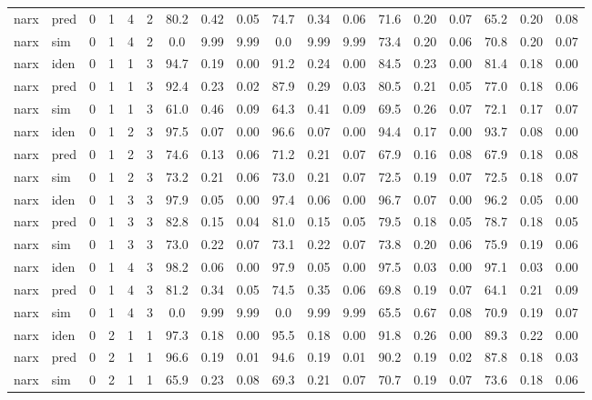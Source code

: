 \begin{landscape}
\begin{center}
\begin{longtable}{ll|cccc|ccc|ccc|ccc|ccc}
narx & pred & 0 & 1 & 4 & 2 & 80.2 & 0.42 & 0.05 & 74.7 & 0.34 & 0.06 & 71.6 & 0.20 & 0.07 & 65.2 & 0.20 & 0.08 \\ 
narx & sim  & 0 & 1 & 4 & 2 & 0.0 & 9.99 & 9.99 & 0.0 & 9.99 & 9.99 & 73.4 & 0.20 & 0.06 & 70.8 & 0.20 & 0.07 \\ 
 \hline 
narx & iden & 0 & 1 & 1 & 3 & 94.7 & 0.19 & 0.00 & 91.2 & 0.24 & 0.00 & 84.5 & 0.23 & 0.00 & 81.4 & 0.18 & 0.00 \\ 
narx & pred & 0 & 1 & 1 & 3 & 92.4 & 0.23 & 0.02 & 87.9 & 0.29 & 0.03 & 80.5 & 0.21 & 0.05 & 77.0 & 0.18 & 0.06 \\ 
narx & sim  & 0 & 1 & 1 & 3 & 61.0 & 0.46 & 0.09 & 64.3 & 0.41 & 0.09 & 69.5 & 0.26 & 0.07 & 72.1 & 0.17 & 0.07 \\ 
 \hline 
narx & iden & 0 & 1 & 2 & 3 & 97.5 & 0.07 & 0.00 & 96.6 & 0.07 & 0.00 & 94.4 & 0.17 & 0.00 & 93.7 & 0.08 & 0.00 \\ 
narx & pred & 0 & 1 & 2 & 3 & 74.6 & 0.13 & 0.06 & 71.2 & 0.21 & 0.07 & 67.9 & 0.16 & 0.08 & 67.9 & 0.18 & 0.08 \\ 
narx & sim  & 0 & 1 & 2 & 3 & 73.2 & 0.21 & 0.06 & 73.0 & 0.21 & 0.07 & 72.5 & 0.19 & 0.07 & 72.5 & 0.18 & 0.07 \\ 
 \hline 
narx & iden & 0 & 1 & 3 & 3 & 97.9 & 0.05 & 0.00 & 97.4 & 0.06 & 0.00 & 96.7 & 0.07 & 0.00 & 96.2 & 0.05 & 0.00 \\ 
narx & pred & 0 & 1 & 3 & 3 & 82.8 & 0.15 & 0.04 & 81.0 & 0.15 & 0.05 & 79.5 & 0.18 & 0.05 & 78.7 & 0.18 & 0.05 \\ 
narx & sim  & 0 & 1 & 3 & 3 & 73.0 & 0.22 & 0.07 & 73.1 & 0.22 & 0.07 & 73.8 & 0.20 & 0.06 & 75.9 & 0.19 & 0.06 \\ 
 \hline 
narx & iden & 0 & 1 & 4 & 3 & 98.2 & 0.06 & 0.00 & 97.9 & 0.05 & 0.00 & 97.5 & 0.03 & 0.00 & 97.1 & 0.03 & 0.00 \\ 
narx & pred & 0 & 1 & 4 & 3 & 81.2 & 0.34 & 0.05 & 74.5 & 0.35 & 0.06 & 69.8 & 0.19 & 0.07 & 64.1 & 0.21 & 0.09 \\ 
narx & sim  & 0 & 1 & 4 & 3 & 0.0 & 9.99 & 9.99 & 0.0 & 9.99 & 9.99 & 65.5 & 0.67 & 0.08 & 70.9 & 0.19 & 0.07 \\ 
 \hline 
narx & iden & 0 & 2 & 1 & 1 & 97.3 & 0.18 & 0.00 & 95.5 & 0.18 & 0.00 & 91.8 & 0.26 & 0.00 & 89.3 & 0.22 & 0.00 \\ 
narx & pred & 0 & 2 & 1 & 1 & 96.6 & 0.19 & 0.01 & 94.6 & 0.19 & 0.01 & 90.2 & 0.19 & 0.02 & 87.8 & 0.18 & 0.03 \\ 
narx & sim  & 0 & 2 & 1 & 1 & 65.9 & 0.23 & 0.08 & 69.3 & 0.21 & 0.07 & 70.7 & 0.19 & 0.07 & 73.6 & 0.18 & 0.06 \\ 

\end{longtable}
\end{center}
\end{landscape}
